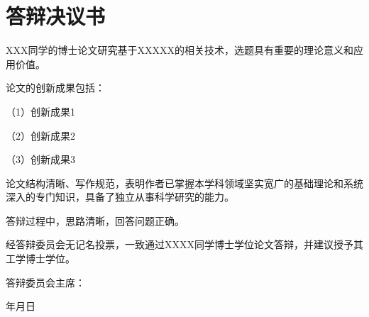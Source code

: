 \chapter*{答辩决议书}

{\songti {}\setlength{\baselineskip}{16bp}
	XXX同学的博士论文研究基于XXXXX的相关技术，选题具有重要的理论意义和应用价值。

	论文的创新成果包括：

	（1）创新成果1

	（2）创新成果2

	（3）创新成果3

	论文结构清晰、写作规范，表明作者已掌握本学科领域坚实宽广的基础理论和系统深入的专门知识，具备了独立从事科学研究的能力。

	答辩过程中，思路清晰，回答问题正确。

	经答辩委员会无记名投票，一致通过XXXX同学博士学位论文答辩，并建议授予其工学博士学位。

	\vspace*{3em}
	\hfill 答辩委员会主席：\hspace*{7em}

	\vspace*{1em}
	\hfill \hspace*{4em}年\hspace*{2em}月\hspace*{2em}日
}